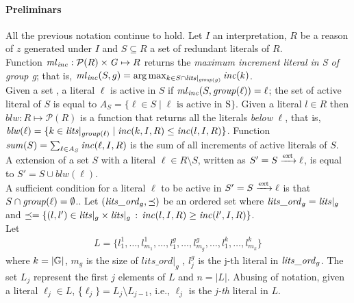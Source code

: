 \paragraph*{Preliminars} All the previous notation continue to hold.
Let $I$ an interpretation, $R$ be a reason of $z$ generated under $I$ 
and $S \subseteq R$ a set of redundant literals of $R$.\\
Function $\mathit{\mathit{ml}_{\mathit{inc}}} : \mathcal{P}(R) \times \mathit{G} \mapsto R$ 
returns the \textit{maximum increment literal in S of group g};
that is, 
$\mathit{ml}_{\mathit{inc}}(S,g)= \arg\max_{k \in S \cap \mathit{lits}|_{{\mathit{group}(g)}}} \mathit{inc}(k)$.\\   
Given a set , a literal $\ell$ is active in $S$ if $\mathit{ml}_{\mathit{inc}}(S,\mathit{group}(\ell)) = \ell$;
the set of active literal of $S$ is equal to $A_S = \{\ell \in S \mid \ell \text{ is active in S}\}$.
Given a literal $l \in R$ then $blw: R \mapsto \mathcal{P}(R)$ is a function 
that returns all the literals \textit{below} $\ell$, 
that is, $\mathit{blw}(\ell) = \{ k \in \mathit{lits}|_{\mathit{group}(\ell)} \mid \mathit{inc}(k,I,R) \le \mathit{inc}(l,I,R) \}$.
Function $\mathit{sum}(S) = \sum_{\ell \in A_S} \mathit{inc}(\ell,I,R)$ is the sum of all increments  
of active literals of $S$.\\
A extension of a set $S$ with a literal $\ell \in R \setminus S$, written as $S' = S \xrightarrow{\text{ext}} \ell$,
is equal to $S' = S \cup blw(\ell)$.\\
A sufficient condition for a literal $\ell$ 
to be active in $S' = S \xrightarrow{\text{ext}} \ell$ is that 
$S \cap \mathit{group}(\ell) = \emptyset$..
Let $(\mathit{lits}\_\mathit{ord}_g, \preceq)$ be an ordered set where $\mathit{lits}\_\mathit{ord}_g = \mathit{lits}|_g$
and $\preceq = \{(l,l') \in \mathit{lits}|_g \times \mathit{lits}|_g \,:\, \mathit{inc}(l,I,R) \ge \mathit{inc}(l',I,R)\}$.\\
Let 
\begin{align}
    \label{eq:L}
    L = \{l^1_1,\hdots,l^1_{m_1},\hdots,l^g_1,\hdots,l^g_{m_g},\hdots,l^k_1,\hdots,l^k_{m_k} \}
\end{align}
where $k = |\mathbb{G}|$, $m_g$ is the size of $lits\_\mathit{ord}|_g$ , $l^g_j$ is the j-th literal in $\mathit{lits}\_\mathit{ord}_{g}$.
The set $L_j$ represent the first $j$ elements of $L$ and $n = |L|$.
Abusing of notation, given a literal $\ell_j \in L$, \{$\ell_j\} = L_j \setminus L_{j-1}$, i.e., $\ell_j$
is the \textit{j-th} literal in $L$.

